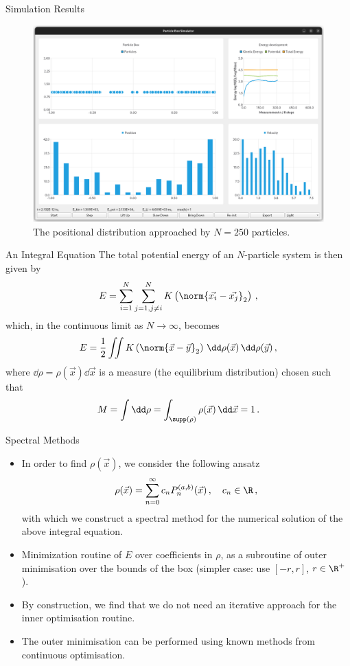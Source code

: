 \documentclass[aspectratio=169, hyperref={colorlinks=true}]{beamer}
\begin{document}
  \begin{frame}{Simulation Results}
    \begin{figure}
      \centering
      \includegraphics[width=0.64\linewidth]{figures/screenshot5.png}
      \caption*{The positional distribution approached by $N = 250$ particles.}
    \end{figure}
  \end{frame}

  \begin{frame}{An Integral Equation}
    \vspace{0.4cm}
    The total potential energy of an $N$-particle system is then given by
    $$E = \sum_{i=1}^{N} \sum_{j=1, j \neq i}^{N} K\left(\norm{\vec{x_i} - \vec{x_j}}_2\right)\,,$$
    which, in the continuous limit as $N \rightarrow \infty$, becomes
    $$E = \frac{1}{2} \iint K\left(\norm{\vec{x} - \vec{y}}_2\right) \,\dd\rho(\vec{x})\,\dd\rho(\vec{y})\,,$$
    where $\dd\rho = \rho(\vec{x})\dd\vec{x}$ is a measure (the equilibrium distribution) chosen such that
    $$M = \int \dd\rho = \int_{\supp(\rho)} \rho(\vec{x}) \,\dd\vec{x} = 1\,.$$
  \end{frame}

  \begin{frame}{Spectral Methods}
    \begin{itemize}
      \item In order to find $\rho(\vec{x})$, we consider the following ansatz
            $$\rho(\vec{x}) = \sum_{n=0}^{\infty} c_n P_n^{(a,b)}(\vec{x})\,,\quad c_n \in \R\,,$$
            with which we construct a spectral method for the numerical solution of the above integral equation.
      \item Minimization routine of $E$ over coefficients in $\rho$, as a subroutine of outer minimisation over the bounds of the box (simpler case: use $[-r, r]$, $r \in \R^+$).
      \item By construction, we find that we do not need an iterative approach for the inner optimisation routine.
      \item The outer minimisation can be performed using known methods from continuous optimisation.
    \end{itemize}
  \end{frame}
\end{document}
